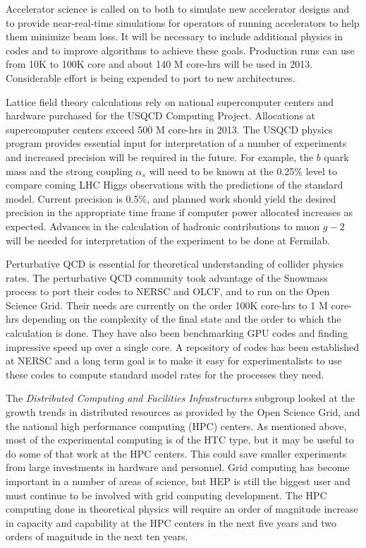 Accelerator science is called on to both to simulate new accelerator designs and to provide near-real-time simulations for operators of running accelerators to help them minimize beam loss. It will be necessary to include additional physics in codes and to improve algorithms to achieve these goals. Production runs can use from 10K to 100K core and about 140 M core-hrs will be used in 2013.  Considerable effort is being expended to port to new architectures.

Lattice field theory calculations rely on national supercomputer centers and hardware purchased for the USQCD Computing Project. Allocations at supercomputer centers exceed 500 M core-hrs in 2013. The USQCD physics program provides essential input for interpretation of a number of experiments and increased precision will be required in the future.  For example, the $b$ quark mass and the strong coupling $\alpha_s$ will need to be known at the 0.25\% level to compare coming LHC Higgs observations with the predictions of the standard model.  Current precision is 0.5\%, and planned work should yield the desired precision in the appropriate time frame if computer power allocated increases as expected. Advances in the calculation of hadronic contributions to muon $g-2$ will be needed for interpretation of the experiment to be done at Fermilab.

Perturbative QCD is essential for theoretical understanding of collider physics rates. The perturbative QCD community took advantage of the Snowmass process to port their codes to NERSC and OLCF, and to run on the Open Science Grid. Their needs are currently on the order 100K core-hrs to 1 M core-hrs depending on the complexity of the final state and the order to which the calculation is done.  They have also been benchmarking GPU codes and finding impressive speed up over a single core.  A repository of codes has been established at NERSC and a long term goal is to make it easy for experimentalists to use these codes to compute standard model rates for the processes they need.

The {\it Distributed Computing and Facilities Infrastructures} subgroup looked at the growth trends in distributed resources as provided by the Open Science Grid, and the national high performance computing (HPC) centers.  As mentioned above, most of the experimental computing is of the HTC type, but it may be useful to do some of that work at the HPC centers.  This could save smaller experiments from large investments in hardware and personnel.  Grid computing has become important in a number of areas of science, but HEP is still the biggest user and must continue to be involved with grid computing development.  The HPC computing done in theoretical physics will require an order of magnitude increase in capacity and capability at the HPC centers in the next five years and two orders of magnitude in the next ten years.

